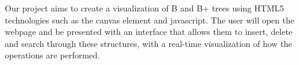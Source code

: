 
Our project aims to create a visualization of B and B+ trees using HTML5
technologies such as the canvas element and javascript. The user will open the
webpage and be presented with an interface that allows them to insert, delete
and search through these structures, with a real-time visualization of how the
operations are performed.

